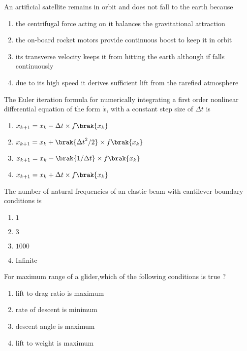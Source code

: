     \item An artificial satellite remains in orbit and does not fall to the earth because 
    \begin{enumerate}
        \item the centrifugal force acting on it balances the gravitational attraction
        \item the on-board rocket motors provide continuous boost to keep it in orbit
        \item its transverse velocity keeps it from hitting the earth although if falls continuously
        \item due to its high speed it derives sufficient lift from the rarefied atmosphere \\
    \end{enumerate}
     
    \item The Euler iteration formula for numerically integrating a first order nonlinear differential equation of the form $\dot{x}$, with a constant step size of $\Delta t$ is 
    \begin{enumerate}
    \item $x_{k+1} = x_{k} - \Delta t \times f\brak{x_{k}}$ 
    \item $x_{k+1} = x_{k} + \brak{{\Delta t}^2/2} \times f\brak{x_{k}}$ 
    \item $x_{k+1} = x_{k} - \brak{1/{\Delta t}} \times f\brak{x_{k}}$ 
    \item $x_{k+1} = x_{k} + \Delta t \times f\brak{x_{k}}$ \\
    \end{enumerate}

    \item The number of natural frequencies of an elastic beam with cantilever boundary conditions is 
    \begin{enumerate}
        \item $1$
        \item $3$
        \item $1000$
        \item Infinite\\
    \end{enumerate}

    \item For maximum range of a glider,which of the following conditions is true ?
    \begin{enumerate}
        \item lift to drag ratio is maximum
        \item rate of descent is minimum
        \item descent angle is maximum
        \item lift to weight is maximum \\
    \end{enumerate}

